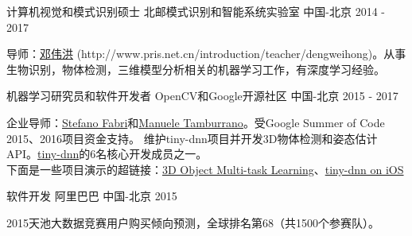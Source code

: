


\begin{cventries}


\cventry
{计算机视觉和模式识别硕士} %
{北邮模式识别和智能系统实验室} %
{中国-北京} %
{2014 - 2017} %
{ %
\begin{cvitems}
\item {导师：\href{http://www.pris.net.cn/introduction/teacher/dengweihong}{邓伟洪} (http://www.pris.net.cn/introduction/teacher/dengweihong)。从事生物识别，物体检测，三维模型分析相关的机器学习工作，有深度学习经验。}
\end{cvitems}
}

\cventry
{机器学习研究员和软件开发者} %
{OpenCV和Google开源社区} %
{中国-北京} %
{2015 - 2017} %
{ %
\begin{cvitems}
\item {企业导师：\href{https://www.linkedin.com/in/stefano-fabri-16a73748}{Stefano Fabri}和\href{https://www.linkedin.com/in/manuele-tamburrano-b82384a5?authType=name&authToken=Di5p&trk=prof-sb-browse_map-name}{Manuele Tamburrano}。受Google Summer of Code 2015、2016项目资金支持。 维护tiny-dnn项目并开发3D物体检测和姿态估计API。\href{https://github.com/tiny-dnn/tiny-dnn}{tiny-dnn}的6名核心开发成员之一。\\
下面是一些项目演示的超链接：\href{https://www.youtube.com/watch?v=Mc20rTYdXTE}{3D Object Multi-task Learning}、\href{https://drive.google.com/open?id=0B-RYa1FDOrYXVUEzcG1mdnl5a3M}{tiny-dnn on iOS}
}
\end{cvitems}
}


\cventry
{软件开发} %
{阿里巴巴} %
{中国-北京} %
{2015} %
{ %
\begin{cvitems}
\item {2015天池大数据竞赛用户购买倾向预测，全球排名第68（共1500个参赛队）。}
\end{cvitems}
}


\end{cventries}

